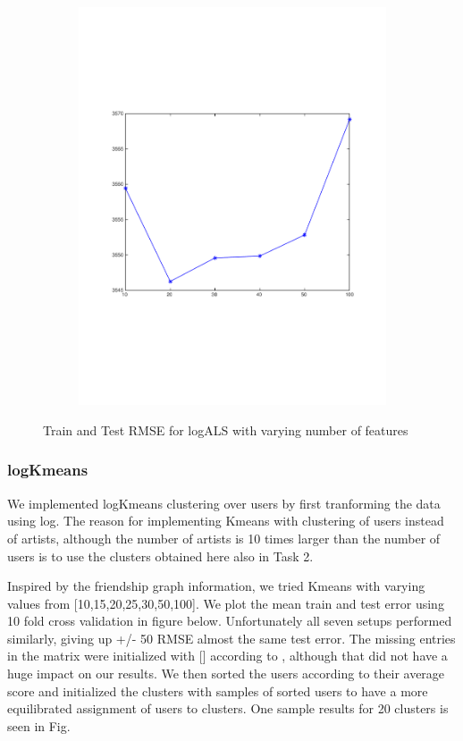 \begin{figure}[h]
\begin{subfigure}[b]{0.45\textwidth}
    \includegraphics[width=\textwidth]{figures/als_test.pdf}
    \caption{}
  \end{subfigure}
  \caption{Train and Test RMSE for logALS with varying number of features}
  \label{fig:new_plot}
\end{figure}

\subsubsection{logKmeans}
We implemented logKmeans clustering over users by first tranforming the data using log.
The reason for implementing Kmeans with clustering of users 
instead of artists, although the number of artists is 10 times larger than the number of users is to 
use the clusters obtained here also in Task 2.

Inspired by the friendship graph information, we tried Kmeans with
varying values from [10,15,20,25,30,50,100]. We plot the mean train and test error using 10 fold cross validation in figure below. Unfortunately all seven setups performed similarly,
giving up +/- 50 RMSE almost the same test error.
The missing entries in the matrix were initialized with [] according to , although that did not have a huge impact on our results. We then sorted the users according to their average score and initialized the clusters with samples of sorted users to have a more equilibrated assignment of users to clusters. One sample results for 20 clusters is seen in Fig.

